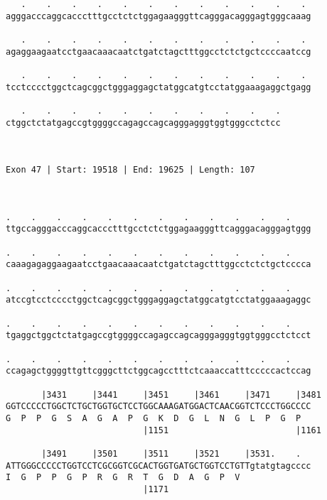\documentclass{article}
\begin{document}
\begin{Verbatim}
   .    .    .    .    .    .    .    .    .    .    .    . 
agggacccaggcaccctttgcctctctggagaagggttcagggacagggagtgggcaaag
                                                            
   .    .    .    .    .    .    .    .    .    .    .    . 
agaggaagaatcctgaacaaacaatctgatctagctttggcctctctgctccccaatccg
                                                            
   .    .    .    .    .    .    .    .    .    .    .    . 
tcctcccctggctcagcggctgggaggagctatggcatgtcctatggaaagaggctgagg
                                                            
   .    .    .    .    .    .    .    .    .    .    .
ctggctctatgagccgtggggccagagccagcagggagggtggtgggcctctcc
                                                      
                                                      
 
Exon 47 | Start: 19518 | End: 19625 | Length: 107



.    .    .    .    .    .    .    .    .    .    .    .    
ttgccagggacccaggcaccctttgcctctctggagaagggttcagggacagggagtggg
                                                            
.    .    .    .    .    .    .    .    .    .    .    .    
caaagagaggaagaatcctgaacaaacaatctgatctagctttggcctctctgctcccca
                                                            
.    .    .    .    .    .    .    .    .    .    .    .    
atccgtcctcccctggctcagcggctgggaggagctatggcatgtcctatggaaagaggc
                                                            
.    .    .    .    .    .    .    .    .    .    .    .    
tgaggctggctctatgagccgtggggccagagccagcagggagggtggtgggcctctcct
                                                            
.    .    .    .    .    .    .    .    .    .    .    .    
ccagagctggggttgttcgggcttctggcagcctttctcaaaccatttcccccactccag
                                                            
       |3431     |3441     |3451     |3461     |3471     |3481
GGTCCCCCTGGCTCTGCTGGTGCTCCTGGCAAAGATGGACTCAACGGTCTCCCTGGCCCC
G  P  P  G  S  A  G  A  P  G  K  D  G  L  N  G  L  P  G  P  
                           |1151                         |1161
  
       |3491     |3501     |3511     |3521     |3531.    .  
ATTGGGCCCCCTGGTCCTCGCGGTCGCACTGGTGATGCTGGTCCTGTTgtatgtagcccc
I  G  P  P  G  P  R  G  R  T  G  D  A  G  P  V              
                           |1171                            
  

\end{Verbatim}
\end{document}
